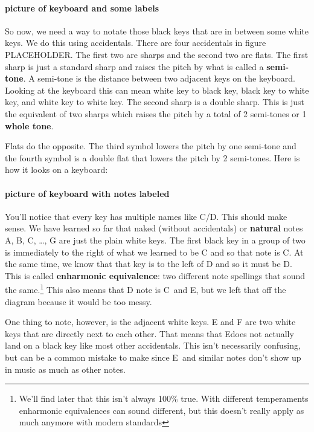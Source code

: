 \documentclass[../OpenAppliedMusicTheory.tex]{subfiles}
\begin{document}
        \paragraph{picture of keyboard and some labels}
        So now, we need a way to notate those black keys that are in between some white keys. We do this using accidentals. There are four accidentals in figure %
        PLACEHOLDER. The first two are sharps and the second two are flats. The first sharp is just a standard sharp and raises the pitch by what is called a \textbf{semi-tone}. A semi-tone is the distance between two adjacent keys on the keyboard. Looking at the keyboard this can mean white key to black key, black key to white key, and white key to white key. The second sharp is a double sharp. This is just the equivalent of two sharps which raises the pitch by a total of 2 semi-tones or 1 \textbf{whole tone}.

        Flats do the opposite. The third symbol lowers the pitch by one semi-tone and the fourth symbol is a double flat that lowers the pitch by 2 semi-tones. Here is how it looks on a keyboard:

        \paragraph{picture of keyboard with notes labeled}
        You'll notice that every key has multiple names like C\sh/D\fl. This should make sense. We have learned so far that naked (without accidentals) or \textbf{natural} notes A, B, C, \dots, G are just the plain white keys. The first black key in a group of two is immediately to the right of what we learned to be C and so that note is C\sh. At the same time, we know that that key is to the left of D and so it must be D\fl. This is called \textbf{enharmonic equivalence}: two different note spellings that sound the same.\footnote{We'll find later that this isn't always 100\% true. %
        With different temperaments enharmonic equivalences can sound different, but this doesn't really apply as much anymore with modern standards }
        This also means that D note is C\musDoubleSharp\ and E\musDoubleFlat, but we left that off the diagram because it would be too messy.

        One thing to note, however, is the adjacent white keys. E and F are two white keys that are directly next to each other. That means that E\sh does not actually land on a black key like most other accidentals. This isn't necessarily confusing, but can be a common mistake to make since E\sh\ and similar notes don't show up in music as much as other notes.
\end{document}
